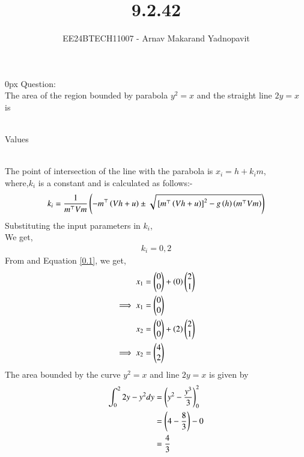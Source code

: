 \documentclass[journal]{IEEEtran}
\begin{document}

\title{9.2.42}
\author{EE24BTECH11007 - Arnav Makarand Yadnopavit}
{\let\newpage\relax\maketitle}
\renewcommand{\thefigure}{\theenumi}
\renewcommand{\thetable}{\theenumi}
\setlength{\intextsep}{10pt} %
\renewcommand{\thetable}{\theenumi}
\parindent 0px
Question:\\
The area of the region bounded by parabola $y^2 = x$ and the straight line $2y = x$ is\\
\solution\\
\begin{table}[h]
    \centering
    
    \caption{Values}
    \label{tab:1}
\end{table}\\
The point of intersection of the line with the parabola is $x_i=h+k_i m$,\\
where,$k_i$ is a constant and is calculated as follows:-
\begin{align}
    k_i=\frac{1}{m^\top Vm}\left(-m^\top \left(Vh+u\right)\pm \sqrt{{}\left[m^\top \left(Vh+u\right)\right]^2-g\left(h\right)\left(m^\top Vm\right)}\right) \label{0.1}
\end{align}
Substituting the input parameters in $k_i$,\\
We get,\\
\begin{align}
    k_i= 0, 2
\end{align}
From  and Equation \ref{0.1}, we get,
\begin{align}
     x_1&=\begin{pmatrix}0\\0\end{pmatrix}+\left(0\right)\begin{pmatrix}2\\1\end{pmatrix}\\
    \implies x_1 &=\begin{pmatrix}0\\0\end{pmatrix}\\
    x_2 &=\begin{pmatrix}0\\0\end{pmatrix}+\left(2\right)\begin{pmatrix}2\\1\end{pmatrix}\\
    \implies x_2&=\begin{pmatrix}4\\2\end{pmatrix}
\end{align}
The area bounded by the curve $y^2 = x$ and line $2y = x$ is given by
\begin{align}
    \int_{0}^{2} 2y-y^2 dy &= \left(y^2-\frac{y^3}{3}\right)_{0}^{2} \\
    &= \left(4-\frac{8}{3}\right)-0\\
    &= \frac{4}{3} 
\end{align}
\end{document}
